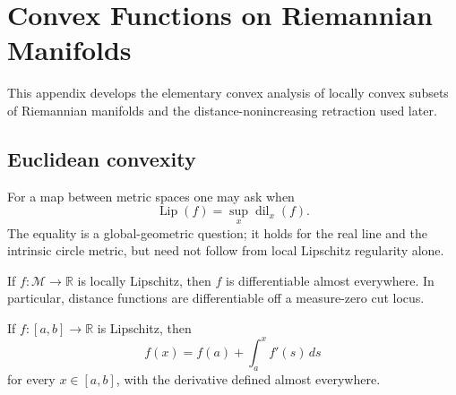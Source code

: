 \chapter{Convex Functions on Riemannian Manifolds}
\label{app:chow-iii-convex-functions-riemannian-manifolds}

\providecommand{\Lip}{\operatorname{Lip}}
\providecommand{\dil}{\operatorname{dil}}
\providecommand{\R}{\mathbb R}
\providecommand{\M}{\mathcal M}
\providecommand{\C}{\mathcal C}
\providecommand{\T}{\widetilde T}
\providecommand{\Xzero}{\mathfrak X_0}
\providecommand{\Vzero}{\mathcal V_0}
\providecommand{\dC}{d_C}

This appendix develops the elementary convex analysis of locally convex subsets
of Riemannian manifolds and the distance-nonincreasing retraction used later.

\section{Euclidean convexity}

\begin{remark}
\label{rem:chow-iii-h1-lipschitz-question}
For a map between metric spaces one may ask when
\[
\Lip(f)=\sup_{x}\dil_x(f).
\]
The equality is a global-geometric question; it holds for the real line and the
intrinsic circle metric, but need not follow from local Lipschitz regularity alone.
\end{remark}

\begin{proposition}
\label{prop:chow-iii-h2-rademacher}
If $f:\M\to\R$ is locally Lipschitz, then $f$ is differentiable almost everywhere.
In particular, distance functions are differentiable off a measure-zero cut locus.
\end{proposition}

\begin{lemma}
\label{lem:chow-iii-h3-lipschitz-ftc}
If $f:[a,b]\to\R$ is Lipschitz, then
\[
f(x)=f(a)+\int_a^x f'(s)\,ds
\]
for every $x\in[a,b]$, with the derivative defined almost everywhere.
\end{lemma}


